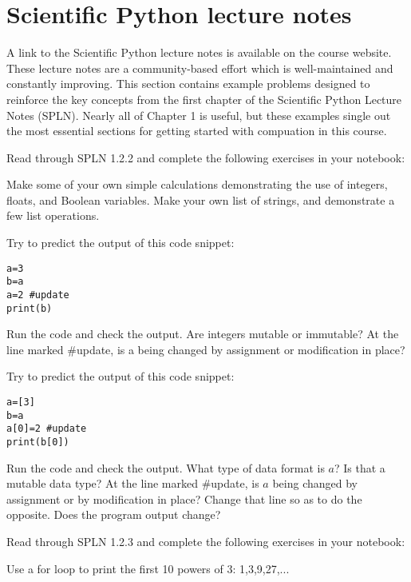 \section{Scientific Python lecture notes}

A link to the Scientific Python lecture notes is available on the
course website.  These lecture notes are a community-based effort
which is well-maintained and constantly improving.  This section
contains example problems designed to reinforce the key concepts from
the first chapter of the Scientific Python Lecture Notes (SPLN).
Nearly all of Chapter 1 is useful, but these examples single out the
most essential sections for getting started with compuation in this
course.

Read through SPLN 1.2.2 and complete the following exercises in your notebook:

\begin{plot}
  Make some of your own simple calculations demonstrating the use of
  integers, floats, and Boolean variables.  Make your own list of
  strings, and demonstrate a few list operations.
\end{plot}

\begin{plot}
\begin{samepage}  
Try to predict the output of this code snippet:
\begin{verbatim}
a=3
b=a
a=2 #update
print(b)
\end{verbatim}
\end{samepage}
Run the code and check the output.  Are integers mutable or immutable?
At the line marked \#update, is a being changed by assignment or modification in place?
\end{plot}

\begin{plot}
Try to predict the output of this code snippet:
\begin{verbatim}
a=[3]
b=a
a[0]=2 #update
print(b[0])
\end{verbatim}
Run the code and check the output.  What type of data format is $a$?
Is that a mutable data type?  At the line marked \#update, is $a$
being changed by assignment or by modification in place?  Change that
line so as to do the opposite.  Does the program output change?
\end{plot}

Read through SPLN 1.2.3 and complete the following exercises in your notebook:

\begin{plot}
Use a for loop to print the first 10 powers of 3:  1,3,9,27,...
\end{plot}

